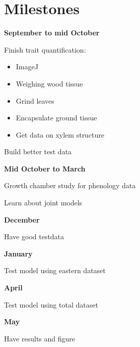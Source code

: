 \documentclass[11pt,a4paper,oneside]{article}
\begin{document}
\section*{Milestones}

\textbf{September to mid October}
\par Finish trait quantification:
\begin{itemize}
\item ImageJ
\item Weighing wood tissue
\item Grind leaves
\item Encapsulate ground tissue
\item Get data on xylem structure 
\end{itemize}
\par Build better test data

\textbf{Mid October to March}
\par Growth chamber study for phenology data
\par Learn about joint models

\textbf{December}
\par Have good testdata

\textbf{January}
\par Test model using eastern dataset

\textbf{April}
\par Test model using total dataset

\textbf{May}
\par Have results and figure

% 

\end{document}
